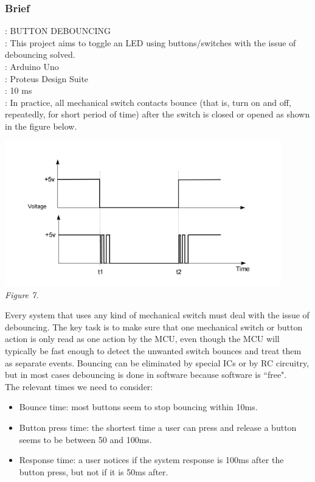 \documentclass[a4paper]{article}
\begin{document}
\subsubsection{Brief}
\text{[TOPIC]}: BUTTON DEBOUNCING\\
\text{[Description]}: This project aims to toggle an LED using buttons/switches with the issue of debouncing solved.\\
\text{[Board]}: Arduino Uno\\
\text{[Simulation]}: Proteus Design Suite\\
: 10 ms\\
\text{[Theory]}: In practice, all mechanical switch contacts bounce (that is, turn on and off, repeatedly, for short period of time) after the switch is closed or opened as shown in the figure below.
\medskip
\begin{center}
    \includegraphics[width=12cm]{pictures/11.png}\\
    \textit{Figure 7.}\\
\end{center}
\medskip
Every system that uses any kind of mechanical switch must deal with the issue of debouncing. The key task is to make sure that one mechanical switch or button action is only read as one action by the MCU, even though the MCU will typically be fast enough to detect the unwanted switch bounces and treat them as separate events. Bouncing can be eliminated by special ICs or by RC circuitry, but in most cases debouncing is done in software because software is “free".\medskip\\
The relevant times we need to consider:
\begin{itemize}
    \item Bounce time: most buttons seem to stop bouncing within 10ms.
    \item Button press time: the shortest time a user can press and release a button seems to be between 50 and 100ms.
    \item Response time: a user notices if the system response is 100ms after the button press, but not if it is 50ms after.
\end{itemize}
\end{document}
